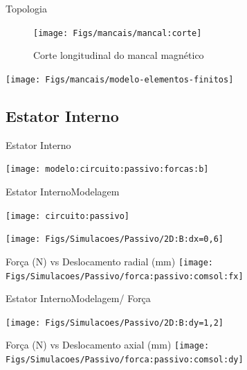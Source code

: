 \documentclass{beamer}
\begin{document}
\begin{frame}{Topologia}
\begin{figure}[th!]
\centering
\texttt{[image: Figs/mancais/mancal:corte]}

Corte longitudinal do mancal magnético
\label{fig:mancal:corte}
\end{figure}


	\begin{center}
	\texttt{[image: Figs/mancais/modelo-elementos-finitos]}
	\end{center}
\end{frame}


\subsection{Estator Interno}

\begin{frame}{Estator Interno}
	\begin{center}
		\texttt{[image: modelo:circuito:passivo:forcas:b]}
	\end{center}
\end{frame}	


\begin{frame}{Estator Interno}{Modelagem}
	
\begin{center}
	\texttt{[image: circuito:passivo]}
\end{center}

	\begin{minipage}[c]{0.48\linewidth}
		\begin{center}
		\texttt{[image: Figs/Simulacoes/Passivo/2D:B:dx=0,6]}
		\end{center}
	\end{minipage}
	\begin{minipage}[c]{0.48\linewidth}
		\begin{center}
			\tiny{Força (N) vs Deslocamento radial (mm)}
		\texttt{[image: Figs/Simulacoes/Passivo/forca:passivo:comsol:fx]}
		\end{center}
	\end{minipage}	

\end{frame}

\begin{frame}{Estator Interno}{Modelagem/ Força}
	
	\begin{minipage}[c]{0.48\linewidth}
		\begin{center}
		\texttt{[image: Figs/Simulacoes/Passivo/2D:B:dy=1,2]}
		\end{center}
	\end{minipage}
	\begin{minipage}[c]{0.48\linewidth}
		\begin{center}
			\tiny{Força (N) vs Deslocamento axial (mm)}
		\texttt{[image: Figs/Simulacoes/Passivo/forca:passivo:comsol:dy]}
		\end{center}
	\end{minipage}	

\end{frame}
	
\end{document}
